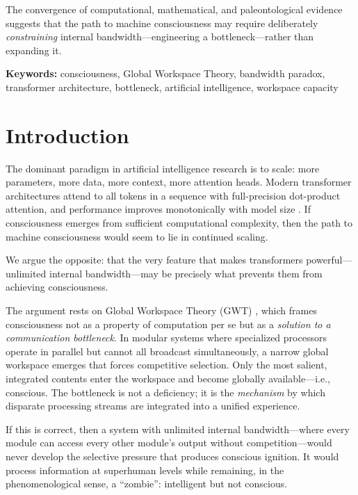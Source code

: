 \documentclass[10pt,letterpaper]{article}
\begin{document}
The convergence of computational, mathematical, and paleontological
evidence suggests that the path to machine consciousness may require
deliberately \emph{constraining} internal bandwidth---engineering a
bottleneck---rather than expanding it.

\noindent\textbf{Keywords:} consciousness, Global Workspace Theory,
bandwidth paradox, transformer architecture, bottleneck, artificial
intelligence, workspace capacity

\linenumbers

\section*{Introduction}

The dominant paradigm in artificial intelligence research is to scale:
more parameters, more data, more context, more attention heads. Modern
transformer architectures attend to all tokens in a sequence with
full-precision dot-product attention, and performance improves
monotonically with model size \cite{kaplan2020scaling}. If consciousness
emerges from sufficient computational complexity, then the path to
machine consciousness would seem to lie in continued scaling.

We argue the opposite: that the very feature that makes transformers
powerful---unlimited internal bandwidth---may be precisely what prevents
them from achieving consciousness.

The argument rests on Global Workspace Theory (GWT) \cite{baars1988},
which frames consciousness not as a property of computation per se but
as a \emph{solution to a communication bottleneck}. In modular systems
where specialized processors operate in parallel but cannot all
broadcast simultaneously, a narrow global workspace emerges that forces
competitive selection. Only the most salient, integrated contents enter
the workspace and become globally available---i.e., conscious. The
bottleneck is not a deficiency; it is the \emph{mechanism} by which
disparate processing streams are integrated into a unified experience.

If this is correct, then a system with unlimited internal bandwidth---where
every module can access every other module's output without
competition---would never develop the selective pressure that produces
conscious ignition. It would process information at superhuman levels
while remaining, in the phenomenological sense, a ``zombie'': intelligent
but not conscious.
\end{document}
